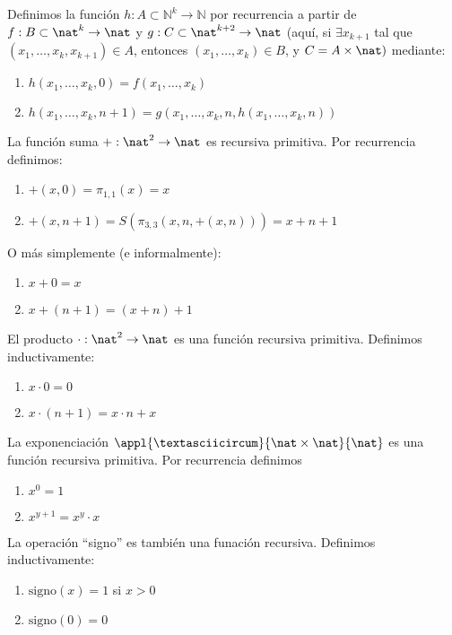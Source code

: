 \begin{defn}
	Definimos la función $h:A\subset\mathbb{N}^k\to\mathbb{N}$ por recurrencia a partir de $f:B\subset\nat^k\to \nat$ y $g:C\subset\nat^{k+2}\to\nat$ (aquí, si $\exists x_{k+1}$ tal que $(x_1, \hdots, x_k, x_{k+1})\in A$, entonces $(x_1, \hdots, x_k)\in B$, y $C=A\times\nat)$ mediante:
	\begin{enumerate}
		\item $h(x_1,\hdots, x_k,0)=f(x_1, \hdots, x_k)$
		\item $h(x_1, \hdots, x_{k}, n+1) = g(x_1, \hdots, x_k,n,h(x_1,\hdots, x_k, n))$
	\end{enumerate}
\end{defn}

\begin{example}
	La función suma $+:\nat^2\to\nat$ es  recursiva primitiva. Por recurrencia definimos:
	\begin{enumerate}
		\item $+(x,0) = \pi_{1,1}(x) = x$
		\item $+(x,n+1) =  S(\pi_{3,3}(x,n,+(x,n))) = x+n+1$
	\end{enumerate}
\end{example}

O más simplemente (e informalmente):
\begin{enumerate}
	\item $x+0 = x$
	\item $x+(n+1) = (x+n) +1$
\end{enumerate}
\begin{example}
	El producto $\cdot:\nat^2\to \nat$ es una función recursiva primitiva. Definimos inductivamente:
	\begin{enumerate}
		\item $x\cdot 0 = 0$
		\item $x\cdot(n+1) = x\cdot n + x$
	\end{enumerate}
\end{example}


\begin{example}
La exponenciación $\appl{ \textasciicircum }{\nat\times \nat}{\nat}$ es una función recursiva primitiva. Por recurrencia definimos
\begin{enumerate}
\item $x^0=1$
\item $x^{y+1} = x^y\cdot x$
\end{enumerate}
\end{example}

\begin{example}
La operación ``signo'' es también una funación recursiva. Definimos inductivamente:
\begin{enumerate}
\item $\text{signo}(x)=1$ si $x>0$
\item $\text{signo}(0)=0$
\end{enumerate}
\end{example}

